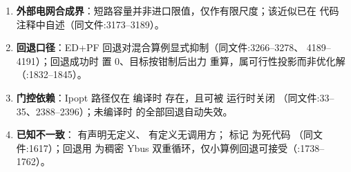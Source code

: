 \begin{enumerate}
        置 0，其价格口径由 Parity 建模层决定（:2527--2531，见
        第~\ref{sec:parityform}~章）。
  \item \textbf{外部电网合成界}：短路容量并非进口限值，仅作有限尺度；该近似已在
        代码注释中自述（同文件:3173--3189）。
  \item \textbf{回退口径}：ED+PF 回退对混合算例显式抑制（同文件:3266--3278、
        4189--4191）；回退成功时  置 0、目标按钳制后出力
        重算，属可行性投影而非优化解（:1832--1845）。
  \item \textbf{门控依赖}：Ipopt 路径仅在  编译时
        存在，且可被  运行时关闭
        （同文件:33--35、2388--2396）；未编译时  的全部回退自动失效。
  \item \textbf{已知不一致}： 有声明无定义、
         有定义无调用方；
         标记  为死代码
        （同文件:1617）；回退用  为稠密 Ybus
        双重循环，仅小算例回退可接受（:1738--1762）。
\end{enumerate}
